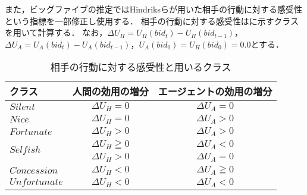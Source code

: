 また，ビッグファイブの推定ではHindriksら\cite{sensebeh}が用いた相手の行動に対する感受性という指標を一部修正し使用する．
相手の行動に対する感受性はに示すクラスを用いて計算する．
なお，$\Delta U_H = U_H(bid_t) - U_H(bid_{t - 1})$，$\Delta U_A = U_A(bid_t) - U_A(bid_{t - 1})$，$U_A(bid_0) = U_H(bid_0) = 0.0$とする．
\begin{table}[b]
    \centering
    \caption{相手の行動に対する感受性と用いるクラス}
    \begin{tabular}{lcc} \toprule
        クラス & 人間の効用の増分 & エージェントの効用の増分 \\ \midrule
        $Silent$ & $\Delta U_H = 0$ & $\Delta U_A = 0$ \\
        $Nice$ & $\Delta U_H = 0$ & $\Delta U_A > 0$ \\
        $Fortunate$ & $\Delta U_H > 0$ & $\Delta U_A > 0$ \\
        \multirow{2}{*}{$\mathit{Selfish}$} & $\Delta U_H \geqq 0$ & $\Delta U_A < 0$ \\ 
         & $\Delta U_H > 0$ & $\Delta U_A = 0$ \\ 
        $Concession$ & $\Delta U_H < 0$ & $\Delta U_A \geqq 0$ \\
        $\mathit{Unfortunate}$ & $\Delta U_H < 0$ & $\Delta U_A < 0$ \\ \bottomrule
    \end{tabular}
    \label{tab:sensebeh}
\end{table}

